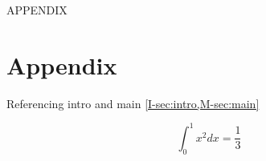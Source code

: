 \documentclass[manuscript.tex]{subfiles}
\numberwithin{equation}{section}
\begin{document}
APPENDIX

\section{Appendix}
\label{sec:appendix}

Referencing intro and main \cref{I-sec:intro,M-sec:main}

\begin{equation}
  \label{eq:appendix:1}
  \int_0^1 x^2 dx = \frac{1}{3}
\end{equation}
\end{document}
